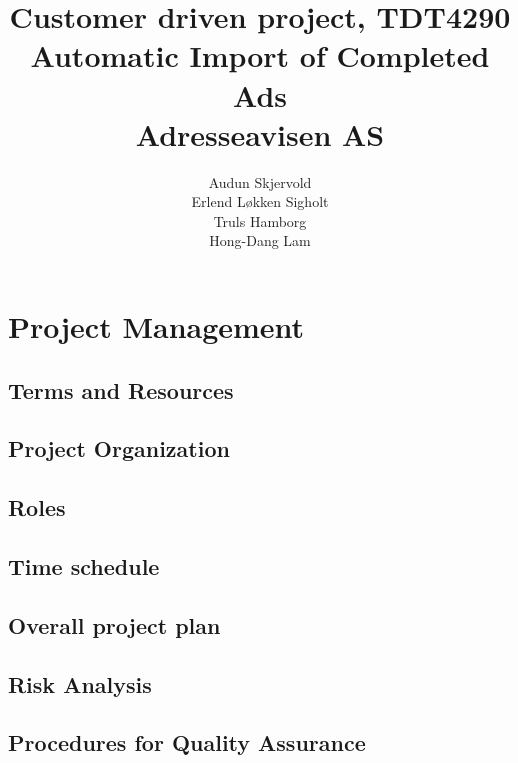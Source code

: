\documentclass[12pt, a4paper]{article}
\title{\normalsize Customer driven project, TDT4290 \\ \LARGE \textbf{Automatic Import of Completed Ads} \normalsize \\Adresseavisen AS}
\author{Audun Skjervold \\ Erlend Løkken Sigholt \\ Truls Hamborg \\ Hong-Dang Lam}
\begin{document}
\maketitle 
\newpage
\tableofcontents
\newpage





\section{Project Management}
\subsection{Terms and Resources}
\subsection{Project Organization}
\subsection{Roles}

\subsection{Time schedule}
\subsection{Overall project plan}
\subsection{Risk Analysis}


\subsection{Procedures for Quality Assurance}












\end{document}
